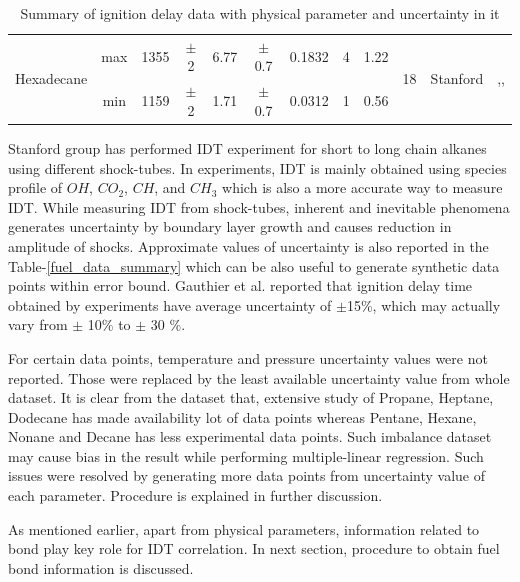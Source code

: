 \documentclass[preprint,12pt]{elsarticle}
\begin{document}
\begin{table}[H]
{{{{\begin{tabular}{|c|c|c|c|c|c|c|c|c|c|c|c|}
						\hline
						\multirow{2}{*}{Hexadecane} & max & 1355 & $\pm$2 & 6.77 & $\pm$0.7 & 0.1832 & 4 & 1.22 & \multirow{2}{*}{18} & \multirow{2}{*}{Stanford} & \multirow{2}{*}{\cite{n_hexadecane},\cite{ hexadecane_diesel},\cite{Haylett_2011_thesis}} \\ \cline{2-9}
						& min & 1159 &$\pm$2 & 1.71 & $\pm$0.7 & 0.0312 & 1 & 0.56 &  &  &  \\ 
						\hline
					\end{tabular}}}}}
					\hspace{0.5cm}
					\vspace{0.1cm}
					\caption{\label{fuel_data_summary}Summary of ignition delay data with physical parameter and uncertainty in it  }
					\label{fuel_table}
					\end{table}
							
				 Stanford group has performed IDT experiment for short to long chain alkanes using different shock-tubes. In experiments, IDT is mainly obtained using species profile of $OH$, $CO_2$, $CH$, and $CH_3$ which is also a more accurate way to measure IDT. While measuring IDT from shock-tubes, inherent  and inevitable phenomena generates uncertainty by boundary layer growth and causes reduction in amplitude of shocks. Approximate values of uncertainty is also reported in the Table-\ref{fuel_data_summary} which can be also useful to generate synthetic data points within error bound. Gauthier et al.\cite{blend_surrogate_fuels} reported that ignition delay time obtained by experiments have average uncertainty of $\pm$15\%, which may actually vary from $\pm$ 10$\%$ to $\pm$ 30 $\%$. 
				 
				 For certain data points, temperature and pressure uncertainty values were not reported. Those were replaced by the least available uncertainty value from whole dataset. It is clear from the dataset that, extensive study of Propane, Heptane, Dodecane has made availability lot of data points  whereas Pentane, Hexane, Nonane and Decane has less experimental data points. Such imbalance dataset may cause bias in the result while performing multiple-linear regression. Such issues were resolved by generating more data points from uncertainty value of each parameter. Procedure is explained in further discussion.
				 
				 As mentioned earlier, apart from  physical parameters, information related to bond play key role for IDT correlation. In next section, procedure to obtain fuel bond information is discussed.
					 
\end{document}
